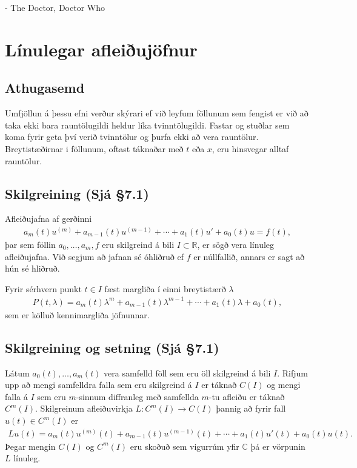 \documentclass[a4paper,10pt,icelandic]{sphinxmanual}
\begin{document}
- The Doctor, Doctor Who


\section{Línulegar afleiðujöfnur}
\label{\detokenize{Kafli07:id1}}

\subsection{Athugasemd}
\label{\detokenize{Kafli07:athugasemd}}
Umfjöllun á þessu efni verður skýrari ef við leyfum
föllunum sem fengist er við að taka ekki bara rauntölugildi heldur líka
tvinntölugildi. Fastar og stuðlar sem koma fyrir geta því verið
tvinntölur og þurfa ekki að vera rauntölur. Breytistæðirnar i föllunum,
oftast táknaðar með \(t\) eða \(x\), eru hinsvegar alltaf
rauntölur.


\subsection{Skilgreining (Sjá \S{}7.1)}
\label{\detokenize{Kafli07:skilgreining-sja-7-1}}
Afleiðujafna af gerðinni
\begin{equation*}
\begin{split}a_m(t)u^{(m)}+a_{m-1}(t)u^{(m-1)}+\cdots+a_1(t)u'+a_0(t)u=f(t),\end{split}
\end{equation*}
þar sem föllin \(a_0,\dots,a_m,f\) eru skilgreind á bili \(I\subset \mathbb{R}\), er sögð vera línuleg afleiðujafna. Við segjum að jafnan sé óhliðruð ef \(f\) er núllfallið, annars er sagt að hún sé hliðruð.

Fyrir sérhvern punkt \(t\in I\) fæst margliða í einni breytistærð \(\lambda\)
\begin{equation*}
\begin{split}P(t,\lambda)= a_m(t)\lambda^{m}+a_{m-1}(t)\lambda^{m-1}+
\cdots+a_1(t)\lambda+a_0(t),\end{split}
\end{equation*}
sem er kölluð kennimargliða jöfnunnar.


\subsection{Skilgreining og setning (Sjá \S{}7.1)}
\label{\detokenize{Kafli07:skilgreining-og-setning-sja-7-1}}
Látum \(a_0(t), \ldots, a_m(t)\) vera samfelld föll sem eru öll skilgreind á bili \(I\). Rifjum upp að mengi samfelldra falla sem eru skilgreind á \(I\) er táknað \(C(I)\) og mengi falla á \(I\) sem eru \(m\)-sinnum diffranleg með samfellda \(m\)-tu afleiðu er táknað \(C^m(I)\). Skilgreinum afleiðuvirkja \(L:C^m(I)\to C(I)\) þannig að fyrir fall \(u(t)\in C^m(I)\) er
\begin{equation*}
\begin{split}Lu(t)=a_m(t)u^{(m)}(t)+a_{m-1}(t)u^{(m-1)}(t)+\cdots+a_1(t)u'(t)+
a_0(t)u(t).\end{split}
\end{equation*}
Þegar mengin \(C(I)\) og \(C^m(I)\) eru skoðuð sem vigurrúm yfir \({\mathbb{C}}\) þá er vörpunin \(L\) línuleg.
\end{document}
